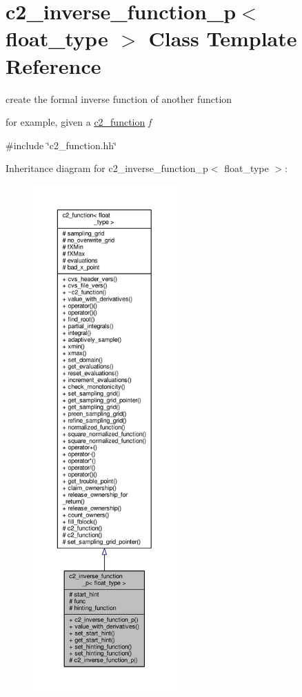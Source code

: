 \hypertarget{classc2__inverse__function__p}{}\section{c2\+\_\+inverse\+\_\+function\+\_\+p$<$ float\+\_\+type $>$ Class Template Reference}
\label{classc2__inverse__function__p}


create the formal inverse function of another function

for example, given a \hyperlink{classc2__function}{c2\+\_\+function} {\itshape f}  




{\ttfamily \#include \char`\"{}c2\+\_\+function.\+hh\char`\"{}}



Inheritance diagram for c2\+\_\+inverse\+\_\+function\+\_\+p$<$ float\+\_\+type $>$\+:
\nopagebreak
\begin{figure}[H]
\begin{center}
\leavevmode
\includegraphics[height=550pt]{classc2__inverse__function__p__inherit__graph}
\end{center}
\end{figure}


